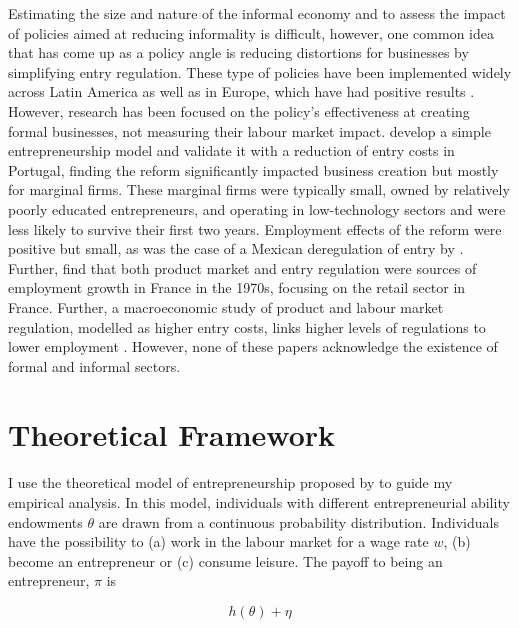 \documentclass[11pt,a4paper]{article}\usepackage[]{graphicx}\usepackage[]{xcolor}
\begin{document}
Estimating the size and nature of the informal economy and to assess the impact of policies aimed at reducing informality is difficult, however, one common idea that has come up as a policy angle is reducing distortions for businesses by simplifying entry regulation. These type of policies have been implemented widely across Latin America as well as in Europe, which have had positive results \parencite{Oviedo.2009}. However, research has been focused on the policy's effectiveness at creating formal businesses, not measuring their labour market impact. \textcite{Branstetter.2014} develop a simple entrepreneurship model and validate it with a reduction of entry costs in Portugal, finding the reform significantly impacted business creation but mostly for marginal firms. These marginal firms were typically small, owned by relatively poorly educated entrepreneurs, and operating in low-technology sectors and were less likely to survive their first two years. Employment effects of the reform were positive but small, as was the case of a Mexican deregulation of entry by \textcite{Kaplan.2011}. Further, \textcite{Bertrand.2002} find that both product market and entry regulation were sources of employment growth in France in the 1970s, focusing on the retail sector in France. Further, a macroeconomic study of product and labour market regulation, modelled as higher entry costs, links higher levels of regulations to lower employment \parencite{Blanchard.2003}. However, none of these papers acknowledge the existence of formal and informal sectors.

\section{Theoretical Framework}

I use the theoretical model of entrepreneurship proposed by \textcite{Branstetter.2014} to guide my empirical analysis. In this model, individuals with different entrepreneurial ability endowments $\theta$ are drawn from a continuous probability distribution. Individuals have the possibility to (a) work in the labour market for a wage rate $w$, (b) become an entrepreneur or (c) consume leisure. The payoff to being an entrepreneur, $\pi$ is

\begin{equation}
  h(\theta) + \eta
\end{equation}
\end{document}
